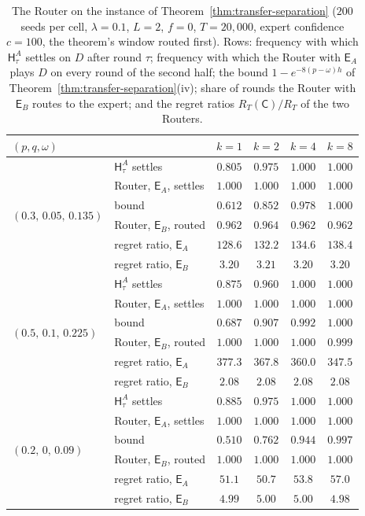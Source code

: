 \documentclass[anon]{alt2027} %
\newcommand{\Cold}{\mathsf{C}}
\newcommand{\Exp}{\mathsf{E}}
\newcommand{\Hyb}{\mathsf{H}}
\begin{document}
\begin{table}[ht]
\centering
\caption{The Router on the instance of Theorem~\ref{thm:transfer-separation}
($200$ seeds per cell, $\lambda=0.1$, $L=2$, $f=0$, $T=20{,}000$, expert confidence
$c=100$, the theorem's window routed first). Rows: frequency with which
$\Hyb^A_\tau$ settles on $D$ after round $\tau$; frequency with which the Router
with $\Exp_A$ plays $D$ on every round of the second half; the bound
$1-e^{-8(p-\omega)h}$ of Theorem~\ref{thm:transfer-separation}(iv); share of
rounds the Router with $\Exp_B$ routes to the expert; and the regret ratios
$R_T(\Cold)/R_T$ of the two Routers.}
\label{tab:router-check}
\small
\begin{tabular}{@{}llcccc@{}}
\toprule
$(p,q,\omega)$ & & $k=1$ & $k=2$ & $k=4$ & $k=8$ \\
\midrule
\multirow{6}{*}{$(0.3,\,0.05,\,0.135)$} & $\Hyb^A_\tau$ settles & $0.805$ & $0.975$ & $1.000$ & $1.000$ \\
 & Router, $\Exp_A$, settles & $1.000$ & $1.000$ & $1.000$ & $1.000$ \\
 & bound & $0.612$ & $0.852$ & $0.978$ & $1.000$ \\
 & Router, $\Exp_B$, routed & $0.962$ & $0.964$ & $0.962$ & $0.962$ \\
 & regret ratio, $\Exp_A$ & $128.6$ & $132.2$ & $134.6$ & $138.4$ \\
 & regret ratio, $\Exp_B$ & $3.20$ & $3.21$ & $3.20$ & $3.20$ \\
\midrule
\multirow{6}{*}{$(0.5,\,0.1,\,0.225)$} & $\Hyb^A_\tau$ settles & $0.875$ & $0.960$ & $1.000$ & $1.000$ \\
 & Router, $\Exp_A$, settles & $1.000$ & $1.000$ & $1.000$ & $1.000$ \\
 & bound & $0.687$ & $0.907$ & $0.992$ & $1.000$ \\
 & Router, $\Exp_B$, routed & $1.000$ & $1.000$ & $1.000$ & $0.999$ \\
 & regret ratio, $\Exp_A$ & $377.3$ & $367.8$ & $360.0$ & $347.5$ \\
 & regret ratio, $\Exp_B$ & $2.08$ & $2.08$ & $2.08$ & $2.08$ \\
\midrule
\multirow{6}{*}{$(0.2,\,0,\,0.09)$} & $\Hyb^A_\tau$ settles & $0.885$ & $0.975$ & $1.000$ & $1.000$ \\
 & Router, $\Exp_A$, settles & $1.000$ & $1.000$ & $1.000$ & $1.000$ \\
 & bound & $0.510$ & $0.762$ & $0.944$ & $0.997$ \\
 & Router, $\Exp_B$, routed & $1.000$ & $1.000$ & $1.000$ & $1.000$ \\
 & regret ratio, $\Exp_A$ & $51.1$ & $50.7$ & $53.8$ & $57.0$ \\
 & regret ratio, $\Exp_B$ & $4.99$ & $5.00$ & $5.00$ & $4.98$ \\
\bottomrule
\end{tabular}
\end{table}
\end{document}
